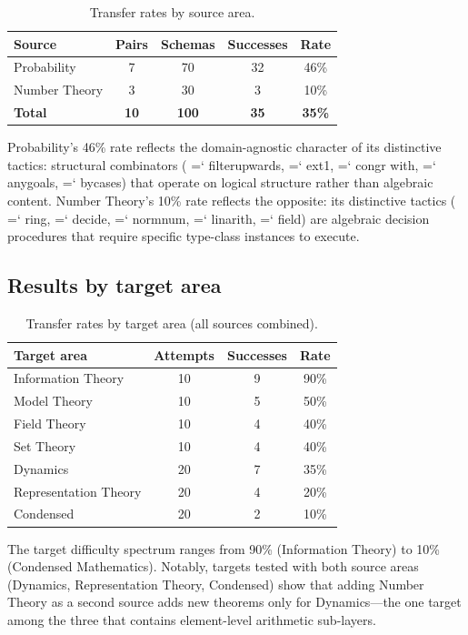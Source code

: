\documentclass[11pt]{article}
\renewcommand{\texttt}[1]{%
  \begingroup\ttfamily\hyphenchar\font=`\-\relax
  \def\_{\textunderscore\discretionary{}{}{}}%
  #1\endgroup}
\theoremstyle{definition}
\theoremstyle{remark}
\begin{document}
\begin{table}[ht]
\centering\small
\caption{Transfer rates by source area.}
\label{tab:by_source}
\begin{tabular}{@{}lcccc@{}}
\toprule
Source & Pairs & Schemas & Successes & Rate \\
\midrule
Probability & 7 & 70 & 32 & 46\% \\
Number Theory & 3 & 30 & 3 & 10\% \\
\midrule
\textbf{Total} & \textbf{10} & \textbf{100} & \textbf{35}
  & \textbf{35\%} \\
\bottomrule
\end{tabular}
\end{table}

Probability's 46\% rate reflects the domain-agnostic character of
its distinctive tactics: structural combinators
(\texttt{filter\_upwards}, \texttt{ext1}, \texttt{congr with},
\texttt{any\_goals}, \texttt{by\_cases}) that operate on logical
structure rather than algebraic content.  Number Theory's 10\% rate
reflects the opposite: its distinctive tactics
(\texttt{ring}, \texttt{decide}, \texttt{norm\_num},
\texttt{linarith}, \texttt{field}) are algebraic decision procedures
that require specific type-class instances to execute.

\subsection{Results by target area}

\begin{table}[ht]
\centering\small
\caption{Transfer rates by target area (all sources combined).}
\label{tab:by_target}
\begin{tabular}{@{}lccc@{}}
\toprule
Target area & Attempts & Successes & Rate \\
\midrule
Information Theory & 10 & 9 & 90\% \\
Model Theory & 10 & 5 & 50\% \\
Field Theory & 10 & 4 & 40\% \\
Set Theory & 10 & 4 & 40\% \\
Dynamics & 20 & 7 & 35\% \\
Representation Theory & 20 & 4 & 20\% \\
Condensed & 20 & 2 & 10\% \\
\bottomrule
\end{tabular}
\end{table}

The target difficulty spectrum ranges from 90\% (Information
Theory) to 10\% (Condensed Mathematics).  Notably, targets tested
with both source areas (Dynamics, Representation Theory, Condensed)
show that adding Number Theory as a second source adds new theorems
only for Dynamics---the one target among the three that contains
element-level arithmetic sub-layers.
\end{document}
